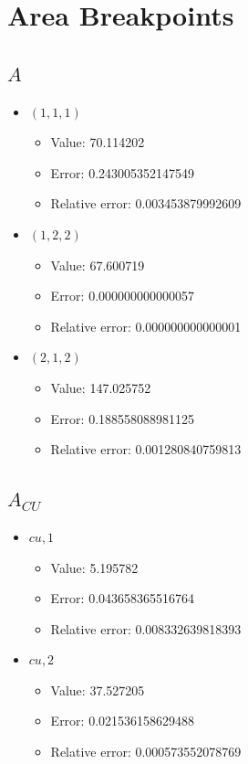 \documentclass{article}%
\begin{document}
\section{Area Breakpoints}%
\thispagestyle{plain}%
\subsection{$A$}%
\begin{itemize}%
	\item $(1, 1, 1)$%
	\begin{itemize}%
		\item Value: 70.114202%
		\item Error: 0.243005352147549%
		\item Relative error: 0.003453879992609%
	\end{itemize}%
	\item $(1, 2, 2)$%
	\begin{itemize}%
		\item Value: 67.600719%
		\item Error: 0.000000000000057%
		\item Relative error: 0.000000000000001%
	\end{itemize}%
	\item $(2, 1, 2)$%
	\begin{itemize}%
		\item Value: 147.025752%
		\item Error: 0.188558088981125%
		\item Relative error: 0.001280840759813%
	\end{itemize}%
\end{itemize}%
\subsection{$A_{CU}$}%
\begin{itemize}%
	\item $\textit{cu},1$%
	\begin{itemize}%
		\item Value: 5.195782%
		\item Error: 0.043658365516764%
		\item Relative error: 0.008332639818393%
	\end{itemize}%
	\item $\textit{cu},2$%
	\begin{itemize}%
		\item Value: 37.527205%
		\item Error: 0.021536158629488%
		\item Relative error: 0.000573552078769%
	\end{itemize}%
\end{itemize}%
\end{document}
